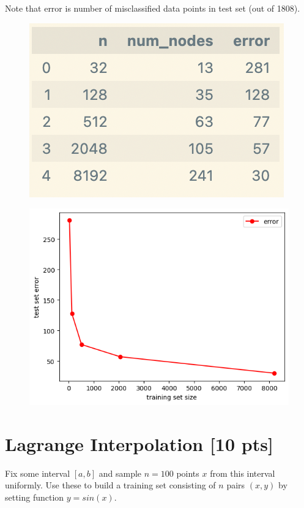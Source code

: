 \documentclass[a4paper]{article}
\theoremstyle{definition}
\newenvironment{soln}{
    \leavevmode\color{blue}\ignorespaces
}{}
\begin{document}
\begin{soln}
  Note that error is number of misclassified data points in test set (out of 1808).
\end{soln}

\begin{figure}[htbp]
  \centerline{\includegraphics[scale=0.75]{sklearn.png}}
\end{figure}

\begin{figure}[htbp]
  \centerline{\includegraphics[scale=0.75]{learning_curve.png}}
\end{figure}

\pagebreak

\section{Lagrange Interpolation [10 pts]}
Fix some interval $[a, b]$ and sample $n = 100$ points $x$ from this interval uniformly. Use these to build a training set consisting of $n$ pairs $(x, y)$ by setting function $y = sin(x)$. \\
\end{document}
